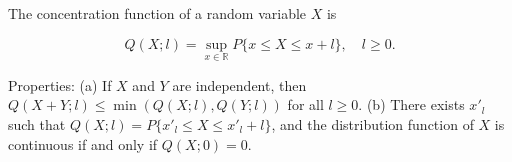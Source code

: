 The concentration function of a random variable $X$ is

$$Q(X; l) = \sup_{x \in \mathbb{R}} P\{x \leq X \leq x + l\}, \quad l \geq 0.$$

Properties:
(a) If $X$ and $Y$ are independent, then $Q(X+Y; l) \leq \min(Q(X; l), Q(Y; l))$ for all $l \geq 0$.
(b) There exists $x'_l$ such that $Q(X; l) = P\{x'_l \leq X \leq x'_l + l\}$, and the distribution function of $X$ is continuous if and only if $Q(X; 0) = 0$.
